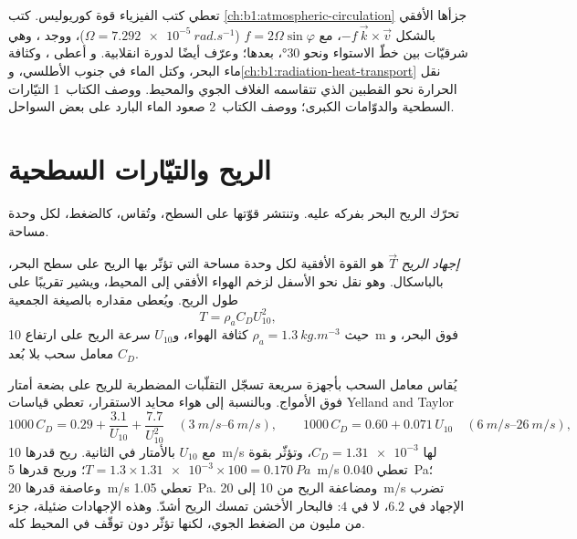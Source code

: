 \begin{recall}
تعطي كتب الفيزياء قوة كوريوليس. كتب \cref{ch:b1:atmospheric-circulation} جزأها الأفقي بالشكل $-f\,\vec k\times\vec v$، مع  $f = 2\Omega\sin\varphi$ ($\Omega = \qty{7.292e-5}{rad.s^{-1}}$)، ووجد ، وهي شرقيّات بين خطّ الاستواء ونحو \ang{30}،  بعدها؛ وعرّف أيضًا  لدورة انقلابية. و أعطى  ، وكثافة ماء البحر،  وكتل الماء في جنوب الأطلسي، و\cref{ch:b1:radiation-heat-transport} نقل الحرارة نحو القطبين الذي تتقاسمه الغلاف الجوي والمحيط. ووصف الكتاب~1 التيّارات السطحية والدوّامات الكبرى؛ ووصف الكتاب~2 صعود الماء البارد على بعض السواحل.
\end{recall}

\section{الريح والتيّارات السطحية}\label{sec:b1:ocean-circulation:wind}

تحرّك الريح البحر بفركه عليه. وتنتشر قوّتها على السطح، وتُقاس، كالضغط، لكل وحدة مساحة.

\begin{definition}\label{def:b1:ocean-circulation:wind-stress}
\emph{إجهاد الريح} $\vec T$ هو القوة الأفقية لكل وحدة مساحة التي تؤثّر بها الريح على سطح البحر، بالباسكال. وهو نقل نحو الأسفل لزخم الهواء الأفقي إلى المحيط، ويشير تقريبًا على طول الريح. ويُعطى مقداره بالصيغة الجمعية
\[
  T = \rho_a C_D U_{10}^2,
\]
حيث $\rho_a = \qty{1.3}{kg.m^{-3}}$ كثافة الهواء، و$U_{10}$ سرعة الريح على ارتفاع \qty{10}{m} فوق البحر، و$C_D$ معامل سحب بلا بُعد.
\end{definition}

يُقاس معامل السحب بأجهزة سريعة تسجّل التقلّبات المضطربة للريح على بضعة أمتار فوق الأمواج. وبالنسبة إلى هواء محايد الاستقرار، تعطي قياسات Yelland and Taylor
\[
  1000\,C_D = 0.29 + \frac{3.1}{U_{10}} + \frac{7.7}{U_{10}^2}
  \quad (\qtyrange{3}{6}{m/s}),
  \qquad
  1000\,C_D = 0.60 + 0.071\,U_{10}
  \quad (\qtyrange{6}{26}{m/s}),
\]
مع $U_{10}$ بالأمتار في الثانية. ريح قدرها \qty{10}{m/s} لها $C_D =
\num{1.31e-3}$، وتؤثّر بقوة $T = 1.3 \times \num{1.31e-3} \times 100 =
\qty{0.170}{Pa}$؛ وريح قدرها \qty{5}{m/s} تعطي \qty{0.040}{Pa}؛ وعاصفة قدرها \qty{20}{m/s} تعطي \qty{1.05}{Pa}. ومضاعفة الريح من 10 إلى \qty{20}{m/s} تضرب الإجهاد في $6.2$، لا في $4$: فالبحار الأخشن تمسك الريح أشدّ. وهذه الإجهادات ضئيلة، جزء من مليون من الضغط الجوي، لكنها تؤثّر دون توقّف في المحيط كله.

